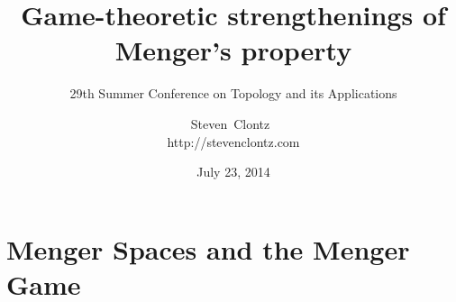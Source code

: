 \documentclass{beamer}
\title
{Game-theoretic strengthenings of Menger's property}
\subtitle
{29th Summer Conference on Topology and its Applications} %
\author%
{Steven~Clontz~\\http://stevenclontz.com}%
\institute[Auburn University] %
{
  Department of Mathematics and Statistics\\
  Auburn University}
\date[14-07-23] %
{July 23, 2014}
\theoremstyle{definition}
\newcommand{\<}{\langle}
\renewcommand{\>}{\rangle}
\begin{document}
\newcommand{\vpause}{\pause\vspace{1em}}

\begin{frame}
  \titlepage
\end{frame}








\section{Menger Spaces and the Menger Game}
\end{document}
